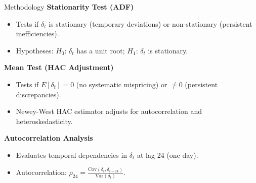 \documentclass[aspectratio=169,xcolor=dvipsnames]{beamer}
\begin{document}
\begin{frame}{Methodology}
\textbf{Stationarity Test (ADF)}
\begin{itemize}
    \item Tests if $\delta_t$ is stationary (temporary deviations) or non-stationary (persistent inefficiencies).
    \item Hypotheses: 
    $H_0$: $\delta_t$ has a unit root; 
    $H_1$: $\delta_t$ is stationary.
\end{itemize}

\textbf{Mean Test (HAC Adjustment)}
\begin{itemize}
    \item Tests if $E[\delta_t] = 0$ (no systematic mispricing) or $\neq 0$ (persistent discrepancies).
    \item Newey-West HAC estimator adjusts for autocorrelation and heteroskedasticity.
\end{itemize}

\textbf{Autocorrelation Analysis}
\begin{itemize}
    \item Evaluates temporal dependencies in $\delta_t$ at lag 24 (one day).
    \item Autocorrelation: $\rho_{24} = \frac{\text{Cov}(\delta_t, \delta_{t-24})}{\text{Var}(\delta_t)}$.
\end{itemize}
    
\end{frame}
\end{document}

